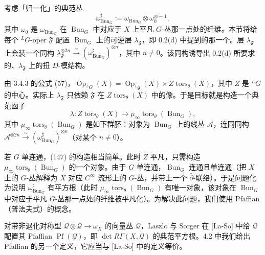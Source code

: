 

 考虑「归一化」的典范丛
\begin{equation}\tag{146}
\omega^{\sharp}_{\operatorname{Bun}_G}:=\omega_{\operatorname{Bun}_G}\otimes\omega_0^{\otimes -1},
\end{equation}
其中 $\omega_0$ 是 $\omega_{\operatorname{Bun}_G}$ 在 $\operatorname{Bun}_G$ 中对应于 $X$ 上平凡 $G$-丛那一点处的纤维。本节将给每个 ${}^{L}G$-oper $\mathfrak{F}$ 配置 $\operatorname{Bun}_G$ 上的可逆层 $\lambda_{\mathfrak{F}}$，即 0.2(d) 中提到的那一个。层 $\lambda_{\mathfrak{F}}$ 上会装一个同构 $\lambda_{\mathfrak{F}}^{\otimes 2n}\xrightarrow{\ \sim\ }(\omega^{\sharp}_{\operatorname{Bun}_G})^{\otimes n}$，其中 $n\ne 0$。该同构诱导出 0.2(d) 所要求的、$\lambda_{\mathfrak{F}}$ 上的扭 $D$-模结构。

由 3.4.3 的公式 (57)，$\operatorname{Op}_{{}^{L}G}(X)=\operatorname{Op}_{{}^{L}\mathfrak{g}}(X)\times Z\operatorname{tors}_{\theta}(X)$，其中 $Z$ 是 ${}^{L}G$ 的中心。实际上 $\lambda_{\mathfrak{F}}$ 只依赖 $\mathfrak{F}$ 在 $Z\operatorname{tors}_{\theta}(X)$ 中的像。于是目标就是构造一个典范函子
\begin{equation}\tag{147}
\lambda:Z\operatorname{tors}_{\theta}(X)\to\mu_\infty\operatorname{tors}_{\theta}(\operatorname{Bun}_G),
\end{equation}
其中 $\mu_\infty\operatorname{tors}_{\theta}(\operatorname{Bun}_G)$ 是如下群胚：对象为 $\operatorname{Bun}_G$ 上的线丛 $\mathcal{A}$，连同同构 $\mathcal{A}^{\otimes 2n}\xrightarrow{\ \sim\ }(\omega^{\sharp}_{\operatorname{Bun}_G})^{\otimes n}$（对某个 $n\ne 0$）。

 若 $G$ 单连通，(147) 的构造相当简单。此时 $Z$ 平凡，只需构造 $\mu_\infty\operatorname{tors}_{\theta}(\operatorname{Bun}_G)$ 的一个对象。由于 $G$ 单连通，$\operatorname{Bun}_G$ 连通且单连通（把 $X$ 上的 $G$-丛解释为 $X$ 对应 $C^\infty$ 流形上的 $G$-丛，并带上一个 $\bar\partial$-联络）。于是问题化为说明 $\omega^{\sharp}_{\operatorname{Bun}_G}$ 有平方根（此时 $\mu_\infty\operatorname{tors}_{\theta}(\operatorname{Bun}_G)$ 有唯一对象，该对象在 $\operatorname{Bun}_G$ 中对应于平凡 $G$-丛那一点处的纤维被平凡化）。为解决此问题，我们使用 Pfaffian（普法夫式）的概念。

对带非退化对称型 $\mathcal{Q}\otimes\mathcal{Q}\to\omega_X$ 的向量丛 $\mathcal{Q}$，Laszlo 与 Sorger 在 [La-So] 中给 $\mathcal{Q}$ 配置其 Pfaffian $\operatorname{Pf}(\mathcal{Q})$，即 $\det R\Gamma(X,\mathcal{Q})$ 的典范平方根。4.2 中我们给出 Pfaffian 的另一个定义，它应当与 [La-So] 中的定义等价。

